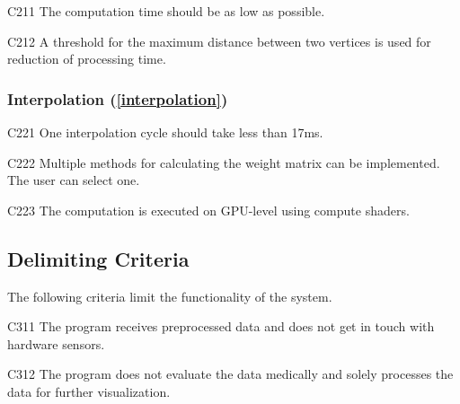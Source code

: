 	\begin{aims}
		
		\item[C211] The computation time should be as low as possible.
		\item[C212] A threshold for the maximum distance between two vertices is used for reduction of processing time.
		
	\end{aims}
	
\subsubsection[Interpolation]{Interpolation (\ref{interpolation})}

	\begin{aims}
	
		\item[C221] One interpolation cycle should take less than 17ms.
		\item[C222] Multiple methods for calculating the weight matrix can be implemented. The user can select one.
		\item[C223] The computation is executed on GPU-level using compute shaders.
	
	\end{aims}
	
	
\subsection{Delimiting Criteria} 
	
	The following criteria limit the functionality of the system.
	
	\begin{aims}
		
		\item[C311] The program receives preprocessed data and does not get in touch with hardware sensors.
		\item[C312] The program does not evaluate the data medically and solely processes the data for further 										visualization. 						
		
	\end{aims}
	



	
